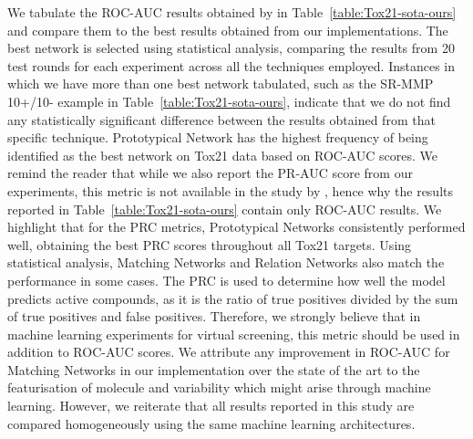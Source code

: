 We tabulate the ROC-AUC results obtained by \citet{altae2017low} in Table~\ref{table:Tox21-sota-ours} and compare them to the best results obtained from our implementations. The best network is selected using statistical analysis, comparing the results from 20 test rounds for each experiment across all the techniques employed. Instances in which we have more than one best network tabulated, such as the SR-MMP 10+/10- example in Table~\ref{table:Tox21-sota-ours}, indicate that we do not find any statistically significant difference between the results obtained from that specific technique. Prototypical Network has the highest frequency of being identified as the best network on Tox21 data based on ROC-AUC scores. We remind the reader that while we also report the PR-AUC score from our experiments, this metric is not available in the study by \citet{altae2017low}, hence why the results reported in Table~\ref{table:Tox21-sota-ours} contain only ROC-AUC results. We highlight that for the PRC metrics, Prototypical Networks consistently performed well, obtaining the best PRC scores throughout all Tox21 targets. Using statistical analysis, Matching Networks and Relation Networks also match the performance in some cases. The PRC is used to determine how well the model predicts active compounds, as it is the ratio of true positives divided by the sum of true positives and false positives. Therefore, we strongly believe that in machine learning experiments for virtual screening, this metric should be used in addition to ROC-AUC scores. We attribute any improvement in ROC-AUC for Matching Networks in our implementation over the state of the art to the featurisation of molecule and variability which might arise through machine learning. However, we reiterate that all results reported in this study are compared homogeneously using the same machine learning architectures. 


